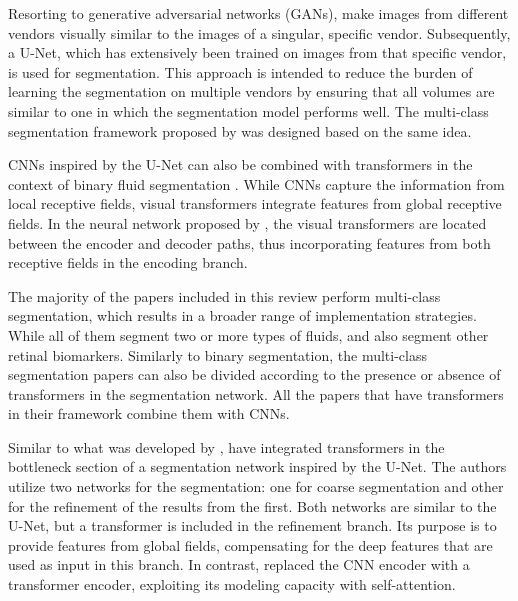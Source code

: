 \par
Resorting to generative adversarial networks (GANs), \textcite{Wu2023} make images from different vendors visually similar to the images of a singular, specific vendor. Subsequently, a U-Net, which has extensively been trained on images from that specific vendor, is used for segmentation. This approach is intended to reduce the burden of learning the segmentation on multiple vendors by ensuring that all volumes are similar to one in which the segmentation model performs well. The multi-class segmentation framework proposed by \textcite{Li2023} was designed based on the same idea. 
\par
CNNs inspired by the U-Net can also be combined with transformers in the context of binary fluid segmentation \parencite{Quek2022}. While CNNs capture the information from local receptive fields, visual transformers integrate features from global receptive fields. In the neural network proposed by \textcite{Quek2022}, the visual transformers are located between the encoder and decoder paths, thus incorporating features from both receptive fields in the encoding branch.
\par
The majority of the papers included in this review perform multi-class segmentation, which results in a broader range of implementation strategies. While all of them segment two or more types of fluids, \textcite{Hassan2021a} and \textcite{Padilla2022} also segment other retinal biomarkers. Similarly to binary segmentation, the multi-class segmentation papers can also be divided according to the presence \parencite{Zhang2023, Liu2024} or absence \parencite{Rahil2023, Hassan2021a, Sappa2021, Xing2022, Tang2022, Padilla2022, Hu2019, Mantel2021, Li2023, Gao2019, Hassan2021b, Lu2019} of transformers in the segmentation network. All the papers that have transformers in their framework combine them with CNNs. 
\par
Similar to what was developed by \textcite{Quek2022}, \textcite{Liu2024} have integrated transformers in the bottleneck section of a segmentation network inspired by the U-Net. The authors utilize two networks for the segmentation: one for coarse segmentation and other for the refinement of the results from the first. Both networks are similar to the U-Net, but a transformer is included in the refinement branch. Its purpose is to provide features from global fields, compensating for the deep features that are used as input in this branch. In contrast, \textcite{Zhang2023} replaced the CNN encoder with a transformer encoder, exploiting its modeling capacity with self-attention.
